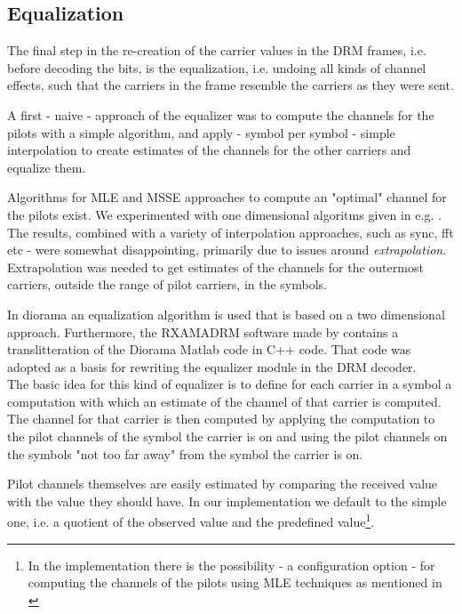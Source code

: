 \documentclass[11pt]{article}
\begin{document}
\subsection{Equalization}
The final step in the re-creation of the carrier values in the DRM frames,
i.e. before decoding the bits,
is the equalization, i.e. undoing all kinds of channel effects, such
that the carriers in the frame resemble the carriers as they were sent.

A first - naive - approach of the equalizer was to
compute the channels for the
pilots with a simple algorithm, and apply - symbol per symbol -
simple interpolation to create estimates of the channels
for the other carriers and equalize them.

Algorithms for MLE and MSSE approaches to compute an "optimal" channel
for the pilots exist. We experimented with 
one dimensional algoritms given in e.g. \cite{Morelli}.
The results, combined with a variety
of interpolation approaches, such as sync, fft etc - were somewhat
disappointing, primarily due to issues around {\em extrapolation}. 
Extrapolation was needed to get
estimates of the channels for the outermost carriers, outside the
range of pilot carriers, in the symbols. 

In diorama\cite{Diorama} an equalization algorithm is used that is based on
a two dimensional approach\cite{Wiener}.
Furthermore, the RXAMADRM software made by \cite{Bos}
contains a translitteration
of the Diorama Matlab code in C++ code.
That code was adopted as a basis for rewriting
the equalizer module in the DRM decoder.
\ \\
The basic idea for this kind of equalizer is
to define for each carrier in a symbol a computation
with which an estimate of the channel of that carrier is computed.
The channel for that carrier is then computed by
applying the computation to the pilot channels
of the symbol the carrier is on and using the pilot channels on
the symbols "not too far away" from the symbol the carrier is on.

Pilot channels themselves are easily estimated by comparing
the received value with the value they should have. In our implementation
we default to the simple one, i.e. a quotient of the observed value and the
predefined value\footnote{In the implementation there is the possibility
- a configuration option - for computing the channels of the pilots
using MLE techniques as mentioned in \cite{Morelli}}.
\end{document}

